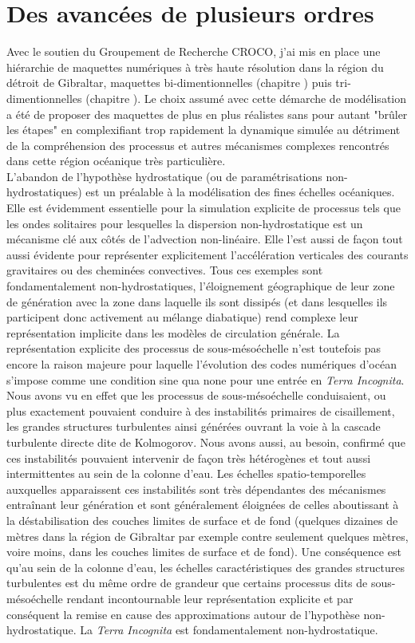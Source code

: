 \section{Des avancées de plusieurs ordres}
Avec le soutien du Groupement de Recherche CROCO, j'ai mis en place une hiérarchie de maquettes numériques à très haute résolution dans la région du détroit de Gibraltar, maquettes bi-dimentionnelles (chapitre ) puis tri-dimentionnelles (chapitre ). Le choix assumé avec cette démarche de modélisation a été de proposer des maquettes de plus en plus réalistes sans pour autant "brûler les étapes" en complexifiant trop rapidement la dynamique simulée au détriment de la compréhension des processus et autres mécanismes complexes rencontrés dans cette région océanique très particulière. \\
L'abandon de l'hypothèse hydrostatique (ou de paramétrisations non-hydrostatiques) est un préalable à la modélisation des fines échelles océaniques. Elle est évidemment essentielle pour la simulation explicite de processus tels que les ondes solitaires pour lesquelles la dispersion non-hydrostatique est un mécanisme clé aux côtés de l'advection non-linéaire. Elle l'est aussi de façon tout aussi évidente pour représenter explicitement l'accélération verticales des courants gravitaires ou des cheminées convectives. Tous ces exemples sont fondamentalement non-hydrostatiques, l'éloignement géographique de leur zone de génération avec la zone dans laquelle ils sont dissipés (et dans lesquelles ils participent donc activement au mélange diabatique) rend complexe leur représentation implicite dans les modèles de circulation générale. La représentation explicite des processus de sous-mésoéchelle n'est toutefois pas encore la raison majeure pour laquelle l'évolution des codes numériques d'océan s'impose comme une condition sine qua none pour une entrée en \textit{Terra Incognita}. Nous avons vu en effet que les processus de sous-mésoéchelle conduisaient, ou plus exactement pouvaient conduire à des instabilités primaires de cisaillement, les grandes structures turbulentes ainsi générées ouvrant la voie à la cascade turbulente directe dite de Kolmogorov. Nous avons aussi, au besoin, confirmé que ces instabilités pouvaient intervenir de façon très hétérogènes et tout aussi intermittentes au sein de la colonne d'eau. Les échelles spatio-temporelles auxquelles apparaissent ces instabilités sont très dépendantes des mécanismes entraînant leur génération et sont généralement éloignées de celles aboutissant à la déstabilisation des couches limites de surface et de fond (quelques dizaines de mètres dans la région de Gibraltar par exemple contre seulement quelques mètres, voire moins, dans les couches limites de surface et de fond). Une conséquence est qu'au sein de la colonne d'eau, les échelles caractéristiques des grandes structures turbulentes est du même ordre de grandeur que certains processus dits de sous-mésoéchelle rendant incontournable leur représentation explicite et par conséquent la remise en cause des approximations autour de l'hypothèse non-hydrostatique. La \textit{Terra Incognita} est fondamentalement non-hydrostatique. \\

